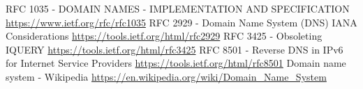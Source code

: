 \documentclass[titlepage]{article}
\begin{document}
\newpage
\begin{thebibliography}{999}
    RFC 1035 - DOMAIN NAMES - IMPLEMENTATION AND SPECIFICATION
    \url{https://www.ietf.org/rfc/rfc1035}
    RFC 2929 - Domain Name System (DNS) IANA Considerations
    \url{https://tools.ietf.org/html/rfc2929}
    RFC 3425 - Obsoleting IQUERY
    \url{https://tools.ietf.org/html/rfc3425}
    RFC 8501 - Reverse DNS in IPv6 for Internet Service Providers
    \url{https://tools.ietf.org/html/rfc8501}
    Domain name system - Wikipedia
    \url{https://en.wikipedia.org/wiki/Domain_Name_System}
\end{thebibliography}
\end{document}
